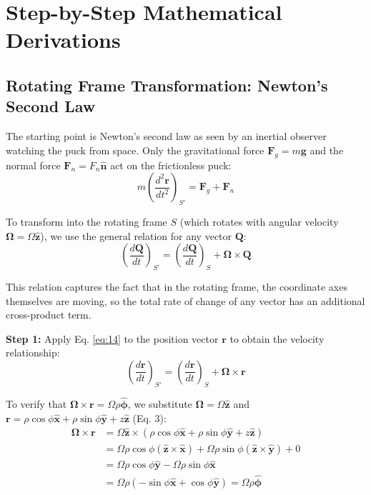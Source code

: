 \documentclass[10pt, a4paper]{article}
\begin{document}
\section{Step-by-Step Mathematical Derivations}
\subsection{Rotating Frame Transformation: Newton’s Second Law}
The starting point is Newton’s second law as seen by an inertial observer watching the puck from space. Only the gravitational force $\mathbf{F}_g = m\mathbf{g}$ and the normal force $\mathbf{F}_n = F_n\hat{\mathbf{n}}$ act on the frictionless puck:
\begin{equation}
    m\left(\frac{d^2\mathbf{r}}{dt^2}\right)_{S'} = \mathbf{F}_g + \mathbf{F}_n 
    \label{eq:9}
\end{equation}

To transform into the rotating frame $S$ (which rotates with angular velocity $\boldsymbol{\Omega} = \Omega \hat{\mathbf{z}}$), we use the general relation for any vector $\mathbf{Q}$:
\begin{equation}
\left(\frac{d\mathbf{Q}}{dt}\right)_{S'} = \left(\frac{d\mathbf{Q}}{dt}\right)_S + \boldsymbol{\Omega} \times \mathbf{Q} \label{eq:14}
\end{equation}

This relation captures the fact that in the rotating frame, the coordinate axes themselves are moving, so the total rate of change of any vector has an additional cross-product term.

\textbf{Step 1:} Apply Eq. \ref{eq:14} to the position vector $\mathbf{r}$ to obtain the velocity relationship: 
\begin{equation}
\left(\frac{d\mathbf{r}}{dt}\right)_{S'} = \left(\frac{d\mathbf{r}}{dt}\right)_S + \boldsymbol{\Omega} \times \mathbf{r} \label{eq:15}
\end{equation}

To verify that $\boldsymbol{\Omega} \times \mathbf{r} = \Omega\rho\hat{\boldsymbol{\phi}}$, we substitute $\boldsymbol{\Omega} = \Omega\hat{\mathbf{z}}$ and $\mathbf{r} = \rho \cos\phi \hat{\mathbf{x}} + \rho \sin\phi \hat{\mathbf{y}} + z\hat{\mathbf{z}}$ (Eq. 3):
\begin{align*}
\boldsymbol{\Omega} \times \mathbf{r} &= \Omega\hat{\mathbf{z}} \times (\rho \cos\phi \hat{\mathbf{x}} + \rho \sin\phi \hat{\mathbf{y}} + z\hat{\mathbf{z}}) \\
&= \Omega\rho \cos\phi (\hat{\mathbf{z}} \times \hat{\mathbf{x}}) + \Omega\rho \sin\phi (\hat{\mathbf{z}} \times \hat{\mathbf{y}}) + 0 \\
&= \Omega\rho \cos\phi \hat{\mathbf{y}} - \Omega\rho \sin\phi \hat{\mathbf{x}} \\
&= \Omega\rho (-\sin\phi \hat{\mathbf{x}} + \cos\phi \hat{\mathbf{y}}) = \Omega\rho\hat{\boldsymbol{\phi}}
\end{align*}
\end{document}
